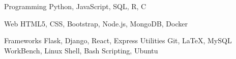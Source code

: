 \begin{cvskills}

  \cvskill
  {Programming}
  {Python, JavaScript, SQL, R, C}
  
  \cvskill
  {Web}
  {HTML5, CSS, Bootstrap, Node.js, MongoDB, Docker}

  \cvskill
  {Frameworks}
  {Flask, Django, React, Express}
  \cvskill
  {Utilities}
  {Git, \LaTeX, MySQL WorkBench, Linux Shell, Bash Scripting, Ubuntu}

\end{cvskills}